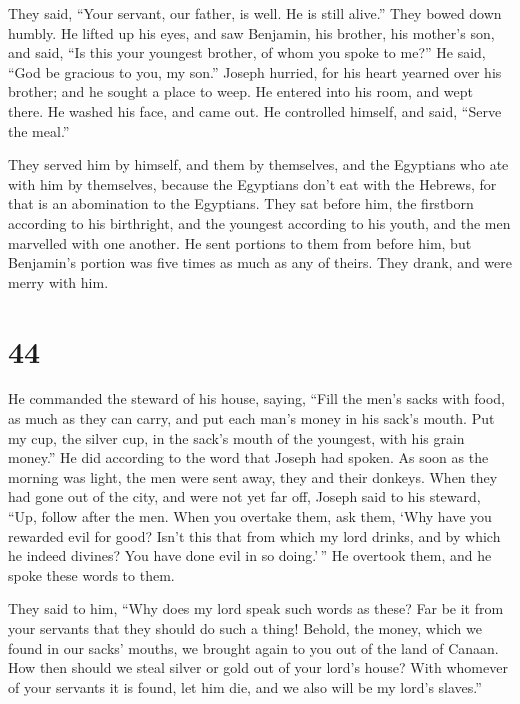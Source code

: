  They said, ``Your servant, our father, is well. He is
still alive.'' They bowed down humbly.  He lifted up his
eyes, and saw Benjamin, his brother, his mother's son, and said, ``Is
this your youngest brother, of whom you spoke to me?'' He said, ``God be
gracious to you, my son.''  Joseph hurried, for his heart
yearned over his brother; and he sought a place to weep. He entered into
his room, and wept there.  He washed his face, and came
out. He controlled himself, and said, ``Serve the meal.''

 They served him by himself, and them by themselves, and
the Egyptians who ate with him by themselves, because the Egyptians
don't eat with the Hebrews, for that is an abomination to the Egyptians.
 They sat before him, the firstborn according to his
birthright, and the youngest according to his youth, and the men
marvelled with one another.  He sent portions to them from
before him, but Benjamin's portion was five times as much as any of
theirs. They drank, and were merry with him.

\hypertarget{section-43}{%
\section{44}\label{section-43}}

 He commanded the steward of his house, saying, ``Fill the
men's sacks with food, as much as they can carry, and put each man's
money in his sack's mouth.  Put my cup, the silver cup, in
the sack's mouth of the youngest, with his grain money.'' He did
according to the word that Joseph had spoken.  As soon as
the morning was light, the men were sent away, they and their donkeys.
 When they had gone out of the city, and were not yet far
off, Joseph said to his steward, ``Up, follow after the men. When you
overtake them, ask them, `Why have you rewarded evil for good?
 Isn't this that from which my lord drinks, and by which he
indeed divines? You have done evil in so doing.'\,''  He
overtook them, and he spoke these words to them.

 They said to him, ``Why does my lord speak such words as
these? Far be it from your servants that they should do such a thing!
 Behold, the money, which we found in our sacks' mouths, we
brought again to you out of the land of Canaan. How then should we steal
silver or gold out of your lord's house?  With whomever of
your servants it is found, let him die, and we also will be my lord's
slaves.''

